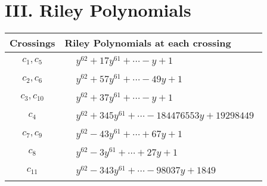 \documentclass[1p]{elsarticle_modified}
\theoremstyle{definition}
\begin{document}
\centering \section*{ III. Riley Polynomials}
\begin{tabular}{m{50pt}|m{274pt}}
Crossings & \hspace{64pt}Riley Polynomials at each crossing \\
\hline $$\begin{aligned}c_{1},c_{5}\end{aligned}$$&$\begin{aligned}
&y^{62}+17 y^{61}+\cdots- y+1
\end{aligned}$\\
\hline $$\begin{aligned}c_{2},c_{6}\end{aligned}$$&$\begin{aligned}
&y^{62}+57 y^{61}+\cdots-49 y+1
\end{aligned}$\\
\hline $$\begin{aligned}c_{3},c_{10}\end{aligned}$$&$\begin{aligned}
&y^{62}+37 y^{61}+\cdots- y+1
\end{aligned}$\\
\hline $$\begin{aligned}c_{4}\end{aligned}$$&$\begin{aligned}
&y^{62}+345 y^{61}+\cdots-184476553 y+19298449
\end{aligned}$\\
\hline $$\begin{aligned}c_{7},c_{9}\end{aligned}$$&$\begin{aligned}
&y^{62}-43 y^{61}+\cdots+67 y+1
\end{aligned}$\\
\hline $$\begin{aligned}c_{8}\end{aligned}$$&$\begin{aligned}
&y^{62}-3 y^{61}+\cdots+27 y+1
\end{aligned}$\\
\hline $$\begin{aligned}c_{11}\end{aligned}$$&$\begin{aligned}
&y^{62}-343 y^{61}+\cdots-98037 y+1849
\end{aligned}$\\
\hline
\end{tabular}
\vskip 2pc
\end{document}
